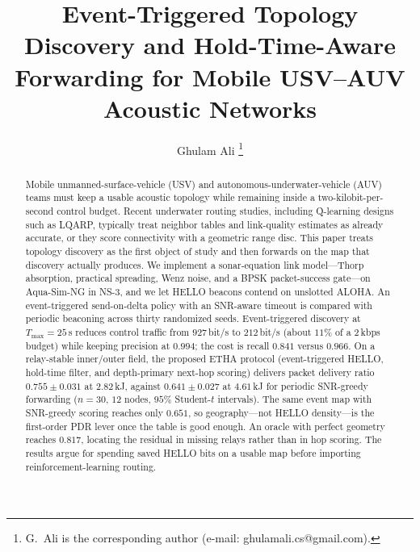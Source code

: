 \documentclass[journal]{IEEEtran}
\begin{document}
\title{Event-Triggered Topology Discovery and Hold-Time-Aware Forwarding
for Mobile USV--AUV Acoustic Networks}

\author{Ghulam Ali%
\thanks{G.~Ali is the corresponding author (e-mail: ghulamali.cs@gmail.com).}%
}


\maketitle

\begin{abstract}
Mobile unmanned-surface-vehicle (USV) and autonomous-underwater-vehicle (AUV)
teams must keep a usable acoustic topology while remaining inside a two-kilobit-per-second
control budget. Recent underwater routing studies, including Q-learning designs
such as LQARP, typically treat neighbor tables and link-quality estimates as
already accurate, or they score connectivity with a geometric range disc.
This paper treats topology discovery as the first object of study and then
forwards on the map that discovery actually produces.
We implement a sonar-equation link model---Thorp absorption, practical spreading,
Wenz noise, and a BPSK packet-success gate---on Aqua-Sim-NG in NS-3, and we let
HELLO beacons contend on unslotted ALOHA. An event-triggered send-on-delta
policy with an SNR-aware timeout is compared with periodic beaconing across
thirty randomized seeds. Event-triggered discovery at $T_{\max}=25$\,s reduces
control traffic from $927$\,bit/s to $212$\,bit/s (about $11\%$ of a $2$\,kbps
budget) while keeping precision at $0.994$; the cost is recall $0.841$ versus
$0.966$. On a relay-stable inner/outer field, the proposed ETHA protocol
(event-triggered HELLO, hold-time filter, and depth-primary next-hop scoring)
delivers packet delivery ratio $0.755\pm 0.031$ at $2.82$\,kJ, against
$0.641\pm 0.027$ at $4.61$\,kJ for periodic SNR-greedy forwarding
($n=30$, $12$ nodes, $95\%$ Student-$t$ intervals). The same event map with
SNR-greedy scoring reaches only $0.651$, so geography---not HELLO density---is
the first-order PDR lever once the table is good enough. An oracle with perfect
geometry reaches $0.817$, locating the residual in missing relays rather than
in hop scoring. The results argue for spending saved HELLO bits on a usable
map before importing reinforcement-learning routing.
\end{abstract}
\end{document}
